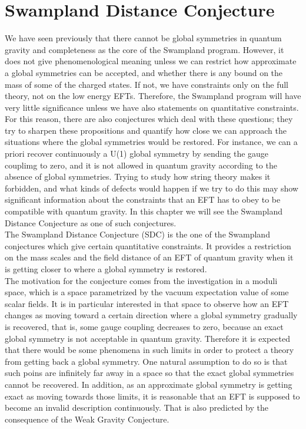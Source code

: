 \section{Swampland Distance Conjecture}
We have seen previously that there cannot be global symmetries in quantum gravity and completeness as the core of the Swampland program. However, it does not give phenomenological meaning unless we can restrict how approximate a global symmetries can be accepted, and whether there is any bound on the mass of some of the charged states. If not, we have constraints only on the full theory, not on the low energy EFTs. Therefore, the Swampland program will have very little significance unless we have also statements on quantitative constraints. For this reason, there are also conjectures which deal with these questions; they try to sharpen these propositions and quantify how close we can approach the situations where the global symmetries would be restored. For instance, we can a priori recover continuously a U(1) global symmetry by sending the gauge couplimg to zero, and it is not allowed in quantum gravity according to the absence of global symmetries. Trying to study how string theory makes it forbidden, and what kinds of defects would happen if we try to do this may show significant information about the constraints that an EFT has to obey to be compatible with quantum gravity. In this chapter we will see the Swampland Distance Conjecture as one of such conjectures. \\
\indent The Swampland Distance Conjecture (SDC) is the one of the Swampland conjectures which give certain quantitative constraints. It provides a restriction on the mass scales and the field distance of an EFT of quantum gravity when it is getting closer to where a global symmetry is restored. \\
\indent The motivation for the conjecture comes from the investigation in a moduli space, which is a space parametrized by the vacuum expectation value of some scalar fields. It is in particular interested in that space to observe how an EFT changes as moving toward a certain direction where a global symmetry gradually is recovered, that is, some gauge coupling decreases to zero, because an exact global symmetry is not acceptable in quantum gravity. Therefore it is expected that there would be some phenomena in such limits in order to protect a theory from getting back a global symmetry. One natural assumption to do so is that such poins are infinitely far away in a space so that the exact global symmetries cannot be recovered. In addition, as an approximate global symmetry is getting exact as moving towards those limits, it is reasonable that an EFT is supposed to become an invalid description continuously. That is also predicted by the consequence of the Weak Gravity Conjecture. \\
